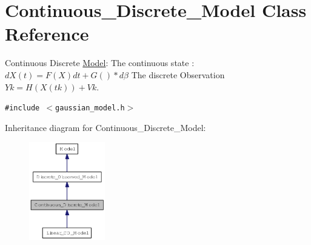 \hypertarget{class_continuous___discrete___model}{
\section{Continuous\_\-Discrete\_\-Model Class Reference}
\label{class_continuous___discrete___model}
}
Continuous Discrete \hyperlink{class_model}{Model}: The continuous state : $ dX(t) = F(X)dt + G()*d\beta $ The discrete Observation $ Yk = H (X(tk)) + Vk $.  


{\tt \#include $<$gaussian\_\-model.h$>$}

Inheritance diagram for Continuous\_\-Discrete\_\-Model:\nopagebreak
\begin{figure}[H]
\begin{center}
\leavevmode
\includegraphics[width=94pt]{class_continuous___discrete___model__inherit__graph}
\end{center}
\end{figure}
